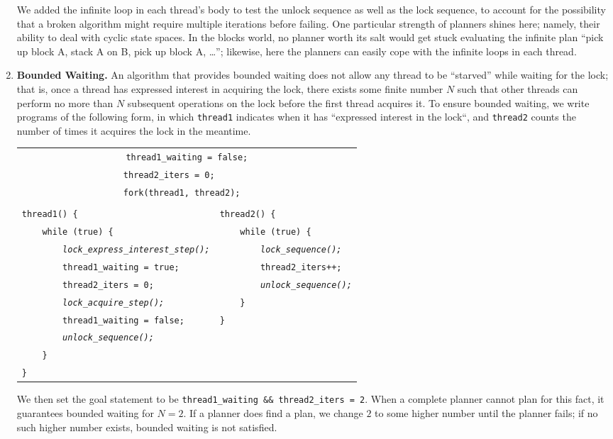 \begin{enumerate}
	We added the infinite loop in each thread's body to test the unlock sequence as well as the lock sequence, to account for the possibility that a broken algorithm might require multiple iterations before failing. One particular strength of planners shines here; namely, their ability to deal with cyclic state spaces. In the blocks world, no planner worth its salt would get stuck evaluating the infinite plan ``pick up block A, stack A on B, pick up block A, \dots''; likewise, here the planners can easily cope with the infinite loops in each thread.
	\item {\bf Bounded Waiting.} An algorithm that provides bounded waiting does not allow any thread to be ``starved'' while waiting for the lock; that is, once a thread has expressed interest in acquiring the lock, there exists some finite number $N$ such that other threads can perform no more than $N$ subsequent operations on the lock before the first thread acquires it.
		To ensure bounded waiting, we write programs of the following form, in which \texttt{thread1} indicates when it has ``expressed interest in the lock``, and \texttt{thread2} counts the number of times it acquires the lock in the meantime.
	\begin{center}
	\begin{tabular}{ll}
	\multicolumn{2}{c}{\texttt{thread1\_waiting = false;}} \\
	\multicolumn{2}{c}{\texttt{thread2\_iters = 0;~~~~~~~}} \\
	\multicolumn{2}{c}{\texttt{fork(thread1, thread2);~~}} \\
	& \\
	\texttt{thread1() \{} & \texttt{thread2() \{} \\
	\texttt{~~~~while (true) \{} & \texttt{~~~~while (true) \{} \\
	\texttt{~~~~~~~~\em lock\_express\_interest\_step();\qquad} & \texttt{~~~~~~~~\em lock\_sequence();} \\
	\texttt{~~~~~~~~thread1\_waiting = true;} & \texttt{~~~~~~~~thread2\_iters++;} \\
	\texttt{~~~~~~~~thread2\_iters = 0;} & \texttt{~~~~~~~~\em unlock\_sequence();} \\
     \texttt{~~~~~~~~\em lock\_acquire\_step();} & \texttt{~~~~\}} \\
	 \texttt{~~~~~~~~thread1\_waiting = false;} & \texttt{\}} \\
	\texttt{~~~~~~~~\em unlock\_sequence();} & \\
	\texttt{~~~~\}} & \\
	\texttt{\}} & \\
	\end{tabular}
	\end{center}
		We then set the goal statement to be \texttt{thread1\_waiting \&\& thread2\_iters = 2}. When a complete planner cannot plan for this fact, it guarantees bounded waiting for $N=2$. If a planner does find a plan, we change $2$ to some higher number until the planner fails; if no such higher number exists, bounded waiting is not satisfied.


\end{enumerate}
